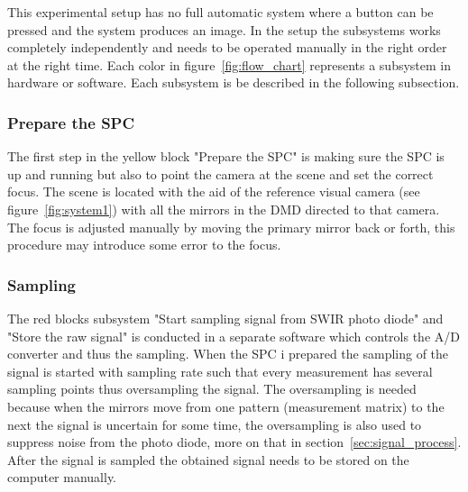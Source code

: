 This experimental setup has no full automatic system where a button can be pressed and the system produces an image. In the setup the subsystems works completely independently and needs to be operated manually in the right order at the right time. Each color in figure~\ref{fig:flow_chart} represents a subsystem in hardware or software. Each subsystem is be described in the following subsection.

 
\subsubsection{Prepare the SPC}
The first step in the yellow block "Prepare the SPC" is making sure the SPC is up and running but also to point the camera at the scene and set the correct focus. The scene is located with the aid of the reference visual camera (see figure~\ref{fig:system1}) with all the mirrors in the DMD directed to that camera. The focus is adjusted manually by moving the primary mirror back or forth, this procedure may introduce some error to the focus.\\[0.1in]

\subsubsection{Sampling}
The red blocks subsystem "Start sampling signal from SWIR photo diode" and "Store the raw signal" is conducted in a separate software which controls the A/D converter and thus the sampling. When the SPC i prepared the sampling of the signal is started with sampling rate such that every measurement has several sampling points thus oversampling the signal. The oversampling is needed because when the mirrors move from one pattern (measurement matrix) to the next the signal is uncertain for some time, the oversampling is also used to suppress noise from the photo diode, more on that in section~\ref{sec:signal_process}. After the signal is sampled the obtained signal needs to be stored on the computer manually.

